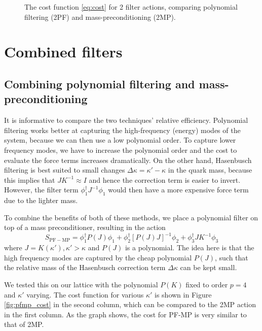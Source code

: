 \begin{figure}
\centering

\caption{The cost function \eqref{eq:cost} for 2 filter actions, comparing polynomial filtering (2PF) and mass-preconditioning (2MP).} \label{fig:2f_cost}
\end{figure}


\section{Combined filters} \label{sec:pf_w_mp}
\subsection{Combining polynomial filtering and mass-preconditioning}
It is informative to compare the two techniques' relative efficiency.
Polynomial filtering works better at capturing the high-frequency (energy) modes of the system, because we can then use a low polynomial order. To capture lower frequency modes, we have to increase the polynomial order and the cost to evaluate the force terms increases dramatically.
On the other hand, Hasenbusch filtering is best suited to small changes $\Delta \kappa = \kappa' - \kappa$ in the quark mass, because this implies that $J K^{-1} \approx I$ and hence the correction term is easier to invert. However, the filter term $\phi_1^\dag J^{-1} \phi_1$ would then have a more expensive force term due to the lighter mass.

To combine the benefits of both of these methods, we place a polynomial filter on top of a mass preconditioner, resulting in the action
\begin{equation}
	S_{\mathrm{PF-MP}} = \phi_1^\dag P(J) \phi_1 + \phi_2^\dag [P(J)J]^{-1}\phi_2 + \phi_3^\dag JK^{-1} \phi_3
\end{equation}
where $J = K(\kappa'), \kappa' > \kappa$ and $P(J)$ is a polynomial.
The idea here is that the high frequency modes are captured by the cheap polynomial $P(J)$, such that the relative mass of the Hasenbusch correction term $\Delta \kappa$ can be kept small.

We tested this on our lattice with the polynomial $P(K)$ fixed to order $p=4$ and $\kappa'$ varying. The cost function for various $\kappa'$ is shown in Figure \ref{fig:pfmp_cost} in the second column, which can be compared to the 2MP action in the first column.
As the graph shows, the cost for PF-MP is very similar to that of 2MP.

